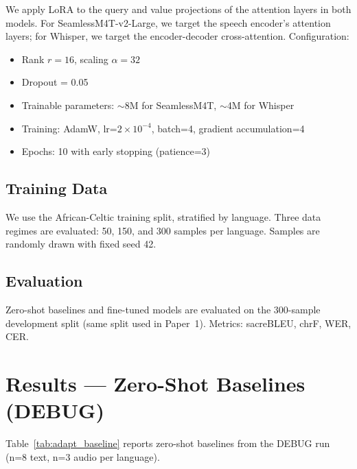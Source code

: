 \documentclass[11pt,a4paper]{article}
\newcommand{\modelSM}{SeamlessM4T-v2-Large}
\begin{document}
We apply LoRA to the query and value projections of the attention layers in both models. For \modelSM{}, we target the speech encoder's attention layers; for Whisper, we target the encoder-decoder cross-attention. Configuration:
\begin{itemize}
  \item Rank $r = 16$, scaling $\alpha = 32$
  \item Dropout = 0.05
  \item Trainable parameters: $\sim$8M for SeamlessM4T, $\sim$4M for Whisper
  \item Training: AdamW, lr=$2\times10^{-4}$, batch=4, gradient accumulation=4
  \item Epochs: 10 with early stopping (patience=3)
\end{itemize}

\subsection{Training Data}
We use the African-Celtic training split, stratified by language. Three data regimes are evaluated: 50, 150, and 300 samples per language. Samples are randomly drawn with fixed seed 42.

\subsection{Evaluation}
Zero-shot baselines and fine-tuned models are evaluated on the 300-sample development split (same split used in Paper~1). Metrics: sacreBLEU, chrF, WER, CER.

\section{Results --- Zero-Shot Baselines (DEBUG)}

Table~\ref{tab:adapt_baseline} reports zero-shot baselines from the DEBUG run (n=8 text, n=3 audio per language).
\end{document}
